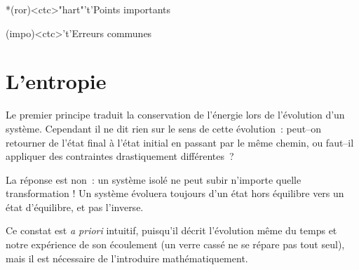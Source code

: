 \documentclass[../../main/main.tex]{subfiles}
\begin{document}
\begin{tcn}[sidebyside, fontupper=\small, fontlower=\small]
	\begin{tcn}*(ror)<ctc>"hart"'t'{Points importants}
	\end{tcn}
	\begin{tcn}(impo)<ctc>'t'{Erreurs communes}
	\end{tcn}
\end{tcn}

\vspace*{\fill}
\newpage

\section{L'entropie}

Le premier principe traduit la conservation de l'énergie lors de l'évolution
d'un système. Cependant il ne dit rien sur le sens de cette évolution~: peut–on
retourner de l'état final à l'état initial en passant par le même chemin, ou
faut–il appliquer des contraintes drastiquement différentes~?

La réponse est non~: un système isolé ne peut subir n'importe quelle
transformation ! Un système évoluera toujours d'un état hors équilibre vers un
état d'équilibre, et pas l'inverse.

Ce constat est \textit{a priori} intuitif, puisqu'il décrit l'évolution même du
temps et notre expérience de son écoulement (un verre cassé ne se répare pas
tout seul), mais il est nécessaire de l'introduire mathématiquement.
\end{document}
